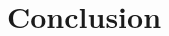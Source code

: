 \chapter{Conclusion} \label{chap:Conclusion}




\begin{multicols}{2}
	
\printbibliography
\end{multicols}

\cleardoublepage
\begin{appendices}


\end{appendices}



